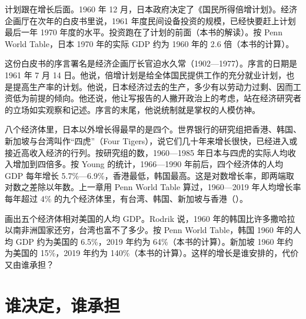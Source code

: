 计划跟在增长后面。1960 年 12 月，日本政府决定了《国民所得倍增计划》\cite{epa1961}。经济企画厅在次年的白皮书里说，1961 年度民间设备投资的规模，已经快要赶上计划最后一年 1970 年度的水平\cite{epa1961}。投资跑在了计划的前面（本书的解读）。按 Penn World Table，日本 1970 年的实际 GDP 约为 1960 年的 2.6 倍（本书的计算）\cite{pwt1001}。

这份白皮书的序言署名是经济企画厅长官迫水久常（1902—1977）\cite{epa1961,loc42}。序言的日期是 1961 年 7 月 14 日\cite{epa1961}。他说，倍增计划是给全体国民提供工作的充分就业计划，也是提高生产率的计划\cite{epa1961}。他说，日本经济过去的生产，多少有以劳动力过剩、因而工资低为前提的倾向\cite{epa1961}。他还说，他让写报告的人撇开政治上的考虑，站在经济研究者的立场如实观察和记述\cite{epa1961}。序言的末尾，他说统制就是掌权的人模仿神\cite{epa1961}。

八个经济体里，日本以外增长得最早的是四个。世界银行的研究组把香港、韩国、新加坡与台湾叫作“四虎”（Four Tigers），说它们几十年来增长很快，已经进入或接近高收入经济的行列\cite{worldbank1993}。按研究组的数，1960—1985 年日本与四虎的实际人均收入增加到四倍多\cite{worldbank1993}。按 Young 的统计，1966—1990 年前后，四个经济体的人均 GDP 每年增长 5.7\%—6.9\%，香港最低，韩国最高\cite{young1994}。这是对数增长率，即两端取对数之差除以年数\cite{young1994}。上一章用 Penn World Table 算过，1960—2019 年人均增长率每年超过 4\% 的九个经济体里，有台湾、韩国、新加坡与香港（）。

画出五个经济体相对美国的人均 GDP。Rodrik 说，1960 年的韩国比许多撒哈拉以南非洲国家还穷，台湾也富不了多少\cite{rodrik1994}。按 Penn World Table，韩国 1960 年的人均 GDP 约为美国的 6.5\%，2019 年约为 64\%（本书的计算）\cite{pwt1001}。新加坡 1960 年约为美国的 15\%，2019 年约为 140\%（本书的计算）。这样的增长是谁安排的，代价又由谁承担？


\section{谁决定，谁承担}\label{sec:eastasia-state}

